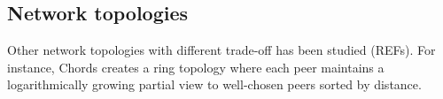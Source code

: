 \subsection{Network topologies}
Other network topologies with different trade-off has been studied (REFs). For
instance, Chords creates a ring topology where each peer maintains a
logarithmically growing partial view to well-chosen peers sorted by distance.

